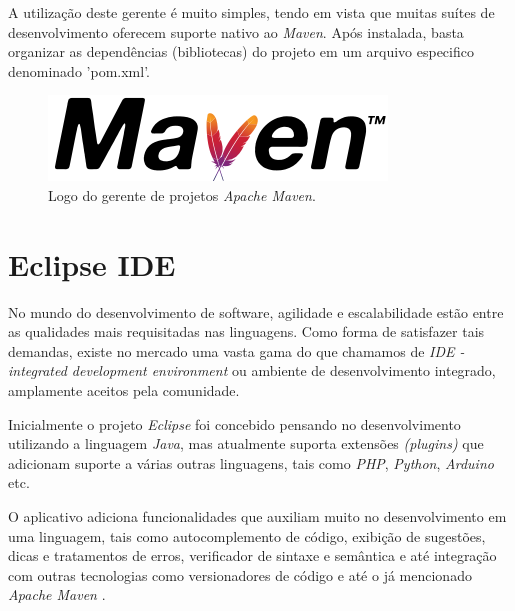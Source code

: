 \documentclass[
	12pt,			%
	openright,		%
	oneside,	
	a4paper,		%
	english,		%
	brazil			%
]{abntex2/abntex2}  %
\begin{document}
	A utilização deste gerente é muito simples, tendo em vista que muitas suítes de desenvolvimento oferecem suporte nativo ao \textit{Maven}. Após instalada, basta organizar as dependências (bibliotecas) do projeto em um arquivo especifico denominado 'pom.xml'.

	\begin{figure}[H]
		\caption{\label{maven-logo}Logo do gerente de projetos \textit{Apache Maven}.}
		\begin{center}
			\includegraphics[scale=0.5]{img/maven-logo}
		\end{center}
	\end{figure}

	\section{Eclipse IDE}
	
	No mundo do desenvolvimento de software, agilidade e escalabilidade estão entre as qualidades mais requisitadas nas linguagens. Como forma de satisfazer tais demandas, existe no mercado uma vasta gama do que chamamos de \textit{IDE - integrated development environment} ou ambiente de desenvolvimento integrado, amplamente aceitos pela comunidade.
	
	Inicialmente o projeto \textit{Eclipse} \cite{eclipse} foi concebido pensando no desenvolvimento utilizando a linguagem \textit{Java}, mas atualmente suporta extensões \textit{(plugins)} que adicionam suporte a várias outras linguagens, tais como \textit{PHP}, \textit{Python}, \textit{Arduino} etc.
	
	O aplicativo adiciona funcionalidades que auxiliam muito no desenvolvimento em uma linguagem, tais como autocomplemento de código, exibição de sugestões, dicas e tratamentos de erros, verificador de sintaxe e semântica e até integração com outras tecnologias como versionadores de código e até o já mencionado \textit{Apache Maven} \cite{maven}.
\end{document}
